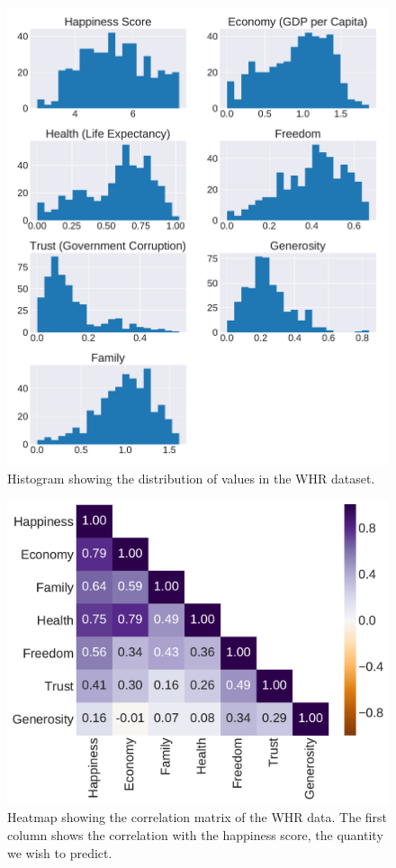 \documentclass[10pt, twocolumn]{article}
\begin{document}
\begin{figure}[H]
    \centering
    \includegraphics[scale=0.38]{../figs/WH_data_hist.pdf}
    \caption{Histogram showing the distribution of values in the WHR dataset.}
    \label{fig:WH_data_hist}
\end{figure}


\begin{figure}[h]
    \centering
    \includegraphics[scale=0.4]{../figs/WH_corr_mat.pdf}
    \caption{Heatmap showing the correlation matrix of the WHR data. The first column shows the correlation with the happiness score, the quantity we wish to predict.}
    \label{fig:WH_corr}
\end{figure}
\end{document}
